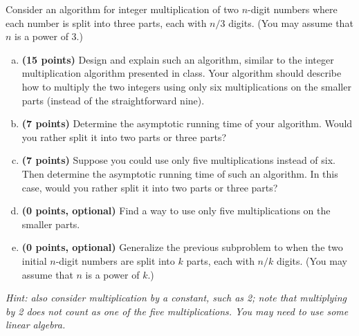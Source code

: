 \documentclass[11pt,letterpaper]{article}
\begin{document}
\pagebreak
\begin{problem}
    Consider an algorithm for integer multiplication of two $n$-digit numbers where each number is split into three parts, each with $n/3$ digits. (You may assume that $n$ is a power of 3.)
    \begin{enumerate}[(a)]
        \item {\bf (15 points)} Design and explain such an algorithm, similar to the integer multiplication algorithm presented in class. Your algorithm should describe how to multiply the two integers using only six multiplications on the smaller parts (instead of the straightforward nine).
        \item {\bf (7 points)} Determine the asymptotic running time of your algorithm. Would you rather split it into two parts or three parts?
        \item {\bf (7 points)} Suppose you could use only five multiplications instead of six.  Then determine the asymptotic running time of such an algorithm. In this case, would you rather split it into two parts or three parts?
        \item {\bf (0 points, optional)} Find a way to use only five multiplications on the smaller parts.
        \item {\bf (0 points, optional)} Generalize the previous subproblem to when the two initial $n$-digit numbers are split into $k$ parts, each with $n/k$ digits. (You may assume that $n$ is a power of $k$.)
    \end{enumerate}
    \textit{Hint: also consider multiplication by a constant, such as 2; note that multiplying by 2 does not count as one of the five multiplications. You may need to use some linear algebra.}
\end{problem}
\end{document}
